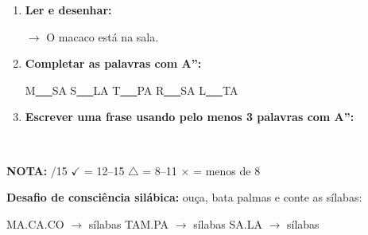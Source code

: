 \begin{exercicio}
\begin{enumerate}[resume]
  \item \textbf{Ler e desenhar:}
  \begin{center}
  $\rightarrow$ O macaco está na sala.
  \end{center}
  \begin{center}
  \end{center}

  \item \textbf{Completar as palavras com A'':}
  \begin{center}
  M\underline{~~~}SA \quad S\underline{~~~}LA \quad T\underline{~~~}PA \quad R\underline{~~~}SA \quad L\underline{~~~}TA
  \end{center}

  \item \textbf{Escrever uma frase usando pelo menos 3 palavras com A'':}
  \begin{center}
  \underline{\hspace{12cm}} \\
  \underline{\hspace{12cm}}
  \end{center}
\end{enumerate}

\noindent\textbf{NOTA:} \underline{\hspace{1cm}}/15 \quad $\checkmark$ = 12--15 \quad $\triangle$ = 8--11 \quad $\times$ = menos de 8
\end{exercicio}

\begin{somsilaba}[title={\faMusic~Som das S\'ilabas --- B\^onus (n\~ao vale nota)}]
\textbf{Desafio de consci\^encia sil\'abica:} ou\c{c}a, bata palmas e conte as s\'ilabas:
\begin{center}
MA.CA.CO $\rightarrow$ \underline{\hspace{1cm}} s\'ilabas \quad TAM.PA $\rightarrow$ \underline{\hspace{1cm}} s\'ilabas \quad SA.LA $\rightarrow$ \underline{\hspace{1cm}} s\'ilabas
\end{center}
\end{somsilaba}



